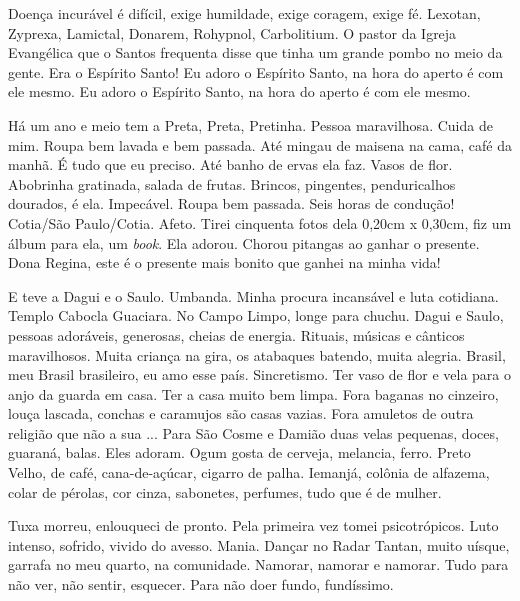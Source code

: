 Doença incurável é difícil, exige humildade, exige coragem, exige fé.
Lexotan, Zyprexa, Lamictal, Donarem, Rohypnol, Carbolitium. O pastor da
Igreja Evangélica que o Santos frequenta disse que tinha um grande pombo
no meio da gente. Era o Espírito Santo! Eu adoro o Espírito Santo, na
hora do aperto é com ele mesmo. Eu adoro o Espírito Santo, na hora do
aperto é com ele mesmo.

Há um ano e meio tem a Preta, Preta, Pretinha. Pessoa maravilhosa. Cuida
de mim. Roupa bem lavada e bem passada. Até mingau de maisena na cama,
café da manhã. É tudo que eu preciso. Até banho de ervas ela faz. Vasos
de flor. Abobrinha gratinada, salada de frutas. Brincos, pingentes,
penduricalhos dourados, é ela. Impecável. Roupa bem passada. Seis horas
de condução! Cotia/São Paulo/Cotia. Afeto. Tirei cinquenta fotos dela
0,20cm x 0,30cm, fiz um álbum para ela, um \emph{book}. Ela adorou.
Chorou pitangas ao ganhar o presente. Dona Regina, este é o presente
mais bonito que ganhei na minha vida!

E teve a Dagui e o Saulo. Umbanda. Minha procura incansável e luta
cotidiana. Templo Cabocla Guaciara. No Campo Limpo, longe para chuchu.
Dagui e Saulo, pessoas adoráveis, generosas, cheias de energia. Rituais,
músicas e cânticos maravilhosos. Muita criança na gira, os atabaques
batendo, muita alegria. Brasil, meu Brasil brasileiro, eu amo esse país.
Sincretismo. Ter vaso de flor e vela para o anjo da guarda em casa. Ter
a casa muito bem limpa. Fora baganas no cinzeiro, louça lascada, conchas
e caramujos são casas vazias. Fora amuletos de outra religião que não a
sua ... Para São Cosme e Damião duas velas pequenas, doces, guaraná,
balas. Eles adoram. Ogum gosta de cerveja, melancia, ferro. Preto Velho,
de café, cana-de-açúcar, cigarro de palha. Iemanjá, colônia de alfazema,
colar de pérolas, cor cinza, sabonetes, perfumes, tudo que é de mulher.

Tuxa morreu, enlouqueci de pronto. Pela primeira vez tomei
psicotrópicos. Luto intenso, sofrido, vivido do avesso. Mania. Dançar no
Radar Tantan, muito uísque, garrafa no meu quarto, na comunidade.
Namorar, namorar e namorar. Tudo para não ver, não sentir, esquecer.
Para não doer fundo, fundíssimo.

